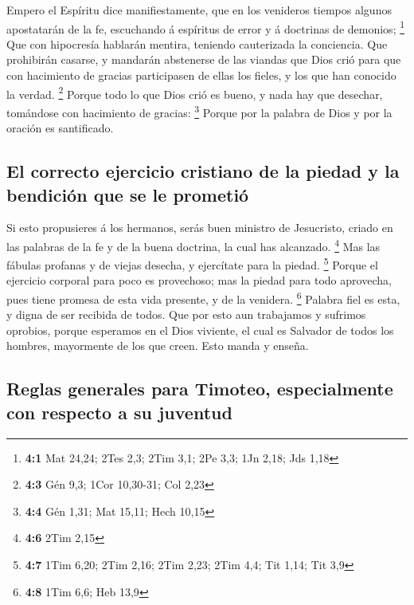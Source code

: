 Empero el Espíritu dice manifiestamente, que en los
venideros tiempos algunos apostatarán de la fe, escuchando á espíritus
de error y á doctrinas de demonios; \footnote{\textbf{4:1} Mat 24,24;
  2Tes 2,3; 2Tim 3,1; 2Pe 3,3; 1Jn 2,18; Jds 1,18}  Que con
hipocresía hablarán mentira, teniendo cauterizada la conciencia.
 Que prohibirán casarse, y mandarán abstenerse de las
viandas que Dios crió para que con hacimiento de gracias participasen de
ellas los fieles, y los que han conocido la verdad. \footnote{\textbf{4:3}
  Gén 9,3; 1Cor 10,30-31; Col 2,23}  Porque todo lo que Dios
crió es bueno, y nada hay que desechar, tomándose con hacimiento de
gracias: \footnote{\textbf{4:4} Gén 1,31; Mat 15,11; Hech 10,15}
 Porque por la palabra de Dios y por la oración es
santificado.

\hypertarget{el-correcto-ejercicio-cristiano-de-la-piedad-y-la-bendiciuxf3n-que-se-le-prometiuxf3}{%
\subsection{El correcto ejercicio cristiano de la piedad y la bendición
que se le
prometió}\label{el-correcto-ejercicio-cristiano-de-la-piedad-y-la-bendiciuxf3n-que-se-le-prometiuxf3}}

 Si esto propusieres á los hermanos, serás buen ministro de
Jesucristo, criado en las palabras de la fe y de la buena doctrina, la
cual has alcanzado. \footnote{\textbf{4:6} 2Tim 2,15}  Mas
las fábulas profanas y de viejas desecha, y ejercítate para la piedad.
\footnote{\textbf{4:7} 1Tim 6,20; 2Tim 2,16; 2Tim 2,23; 2Tim 4,4; Tit
  1,14; Tit 3,9}  Porque el ejercicio corporal para poco es
provechoso; mas la piedad para todo aprovecha, pues tiene promesa de
esta vida presente, y de la venidera. \footnote{\textbf{4:8} 1Tim 6,6;
  Heb 13,9}  Palabra fiel es esta, y digna de ser recibida
de todos.  Que por esto aun trabajamos y sufrimos oprobios,
porque esperamos en el Dios viviente, el cual es Salvador de todos los
hombres, mayormente de los que creen.  Esto manda y enseña.

\hypertarget{reglas-generales-para-timoteo-especialmente-con-respecto-a-su-juventud}{%
\subsection{Reglas generales para Timoteo, especialmente con respecto a
su
juventud}\label{reglas-generales-para-timoteo-especialmente-con-respecto-a-su-juventud}}

